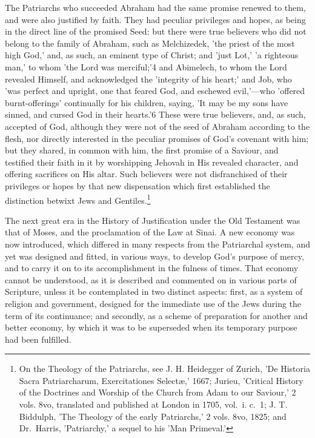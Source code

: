 \documentclass[
]{book}
\begin{document}
The Patriarchs who succeeded Abraham had the same promise renewed to them, and were also justified by faith. They had peculiar privileges and hopes, as being in the direct line of the promised Seed: but there were true believers who did not belong to the family of Abraham, such as Melchizedek, 'the priest of the most high God,' and, as such, an eminent type of Christ; and 'just Lot,' 'a righteous man,' to whom 'the Lord was merciful;'4 and Abimelech, to whom the Lord revealed Himself, and acknowledged the 'integrity of his heart;' and Job, who 'was perfect and upright, one that feared God, and eschewed evil,'---who 'offered burnt-offerings' continually for his children, saying, 'It may be my sons have sinned, and cursed God in their hearts.'6 These were true believers, and, as such, accepted of God, although they were not of the seed of Abraham according to the flesh, nor directly interested in the peculiar promises of God's covenant with him; but they shared, in common with him, the first promise of a Saviour, and testified their faith in it by worshipping Jehovah in His revealed character, and offering sacrifices on His altar. Such believers were not disfranchised of their privileges or hopes by that new dispensation which first established the distinction betwixt Jews and Gentiles.\footnote{On the Theology of the Patriarchs, see J. H. Heidegger of Zurich, 'De Historia Sacra Patriarcharum, Exercitationes Selectæ,' 1667; Jurieu, 'Critical History of the Doctrines and Worship of the Church from Adam to our Saviour,' 2 vols. 8vo, translated and published at London in 1705, vol.~i. c.~1; J. T. Biddulph, 'The Theology of the early Patriarchs,' 2 vols. 8vo, 1825; and Dr.~Harris, 'Patriarchy,' a sequel to his 'Man Primeval.'}

The next great era in the History of Justification under the Old Testament was that of Moses, and the proclamation of the Law at Sinai. A new economy was now introduced, which differed in many respects from the Patriarchal system, and yet was designed and fitted, in various ways, to develop God's purpose of mercy, and to carry it on to its accomplishment in the fulness of times. That economy cannot be understood, as it is described and commented on in various parts of Scripture, unless it be contemplated in two distinct aspects: first, as a system of religion and government, designed for the immediate use of the Jews during the term of its continuance; and secondly, as a scheme of preparation for another and better economy, by which it was to be superseded when its temporary purpose had been fulfilled.
\end{document}
